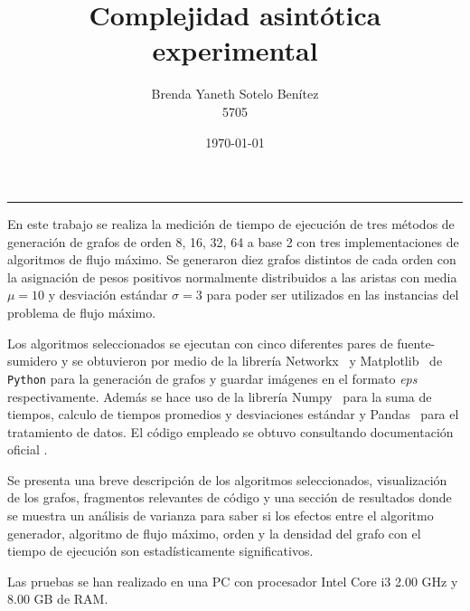 \documentclass{article}
\title{\textbf{Complejidad asintótica experimental}}
\author{Brenda Yaneth Sotelo Benítez \\ 5705}
\date{\today}
\begin{document}
\maketitle

\vspace{-1 cm}
\begin{center}\rule{\textwidth}{0.1mm} \end{center}
\vspace{-1.3 cm}
\begin {center}
\end {center}

En este trabajo se realiza la medición de tiempo de ejecución de tres métodos de generación de grafos de orden 8, 16, 32, 64 a base 2 con tres implementaciones de algoritmos de flujo máximo. Se generaron diez grafos distintos de cada orden con la asignación de pesos positivos normalmente distribuidos a las aristas con media $\mu=10$ y desviación estándar $\sigma=3 $ para poder ser utilizados en las instancias del problema de flujo máximo. 

Los algoritmos seleccionados se ejecutan con cinco diferentes pares de fuente-sumidero y se obtuvieron por medio de la librería \color{blue}Networkx\color{black}\ \cite{Net} y \color{blue}Matplotlib\color{black}\ \cite{Mat} de \texttt{Python} \cite{Python} para la generación de grafos y guardar imágenes en el formato \textit{eps} respectivamente. Además se hace uso de la librería \color{blue}Numpy\color{black}\ \cite{Num} para la suma de tiempos, calculo de tiempos promedios y desviaciones estándar y \color{blue}Pandas\color{black}\ \cite{Pd} para el tratamiento de datos. El código empleado se obtuvo consultando documentación oficial \cite{network}.

Se presenta una breve descripción de los algoritmos seleccionados, visualización de los grafos, fragmentos relevantes de código y una sección de resultados donde se muestra un análisis de varianza para saber si los efectos entre el algoritmo generador, algoritmo de flujo máximo, orden y la densidad del grafo con el tiempo de ejecución son estadísticamente significativos. 

Las pruebas se han realizado en una PC con procesador Intel Core i3 2.00 GHz y 8.00 GB de RAM.
\vspace{-0.5cm}
\newpage
\end{document}
